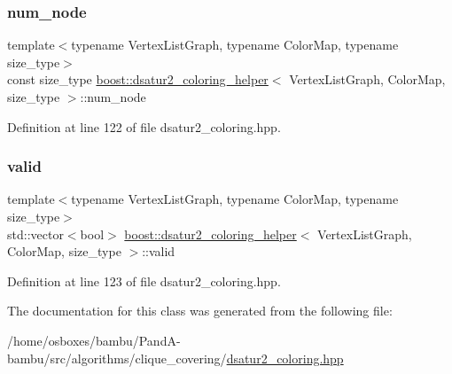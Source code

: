\subsubsection{\texorpdfstring{num\+\_\+node}{num\_node}}
{\footnotesize\ttfamily template$<$typename Vertex\+List\+Graph, typename Color\+Map, typename size\+\_\+type$>$ \\
const size\+\_\+type \hyperlink{classboost_1_1dsatur2__coloring__helper}{boost\+::dsatur2\+\_\+coloring\+\_\+helper}$<$ Vertex\+List\+Graph, Color\+Map, size\+\_\+type $>$\+::num\+\_\+node\hspace{0.3cm}{\ttfamily [private]}}



Definition at line 122 of file dsatur2\+\_\+coloring.\+hpp.

\mbox{\label{classboost_1_1dsatur2__coloring__helper_a65bbfc332c48577d488287470e82a78e}} 
\subsubsection{\texorpdfstring{valid}{valid}}
{\footnotesize\ttfamily template$<$typename Vertex\+List\+Graph, typename Color\+Map, typename size\+\_\+type$>$ \\
std\+::vector$<$bool$>$ \hyperlink{classboost_1_1dsatur2__coloring__helper}{boost\+::dsatur2\+\_\+coloring\+\_\+helper}$<$ Vertex\+List\+Graph, Color\+Map, size\+\_\+type $>$\+::valid\hspace{0.3cm}{\ttfamily [private]}}



Definition at line 123 of file dsatur2\+\_\+coloring.\+hpp.



The documentation for this class was generated from the following file\+:\begin{DoxyCompactItemize}
\item 
/home/osboxes/bambu/\+Pand\+A-\/bambu/src/algorithms/clique\+\_\+covering/\hyperlink{dsatur2__coloring_8hpp}{dsatur2\+\_\+coloring.\+hpp}\end{DoxyCompactItemize}
